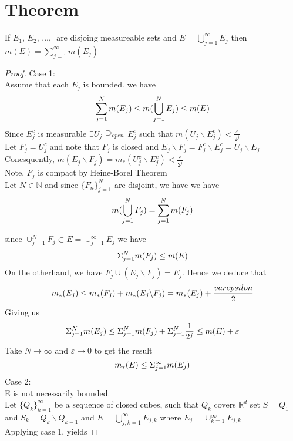 \documentclass{article}[12 pt]
\begin{document}
\section{Theorem}
If $E_1,\,E_2,\,\dots,\,$ are disjoing measureable sets and $E = \bigcup_{j=1}^{\infty}E_j$ then $m(E) = \sum_{j=1}^{\infty}m(E_j)$\\
\begin{proof}
	Case 1:\\
	Assume that each $E_j$ is bounded. we have
	\begin{equation}
		\sum_{j=1}^{N}m(E_j) \leq m(\bigcup_{j=1}^{N}E_j) \leq m(E)\\
	\end{equation}
	Since $E_{j}^{c}$ is measurable $\exists U_j \substack{\supset_{open}} E_j^{c}$ such that $m(U_j\backslash E_j^{c}) < \frac{\varepsilon}{2^j}$\\
	Let $F_j = U_j^{c}$ and note that $F_j$ is closed and $E_j \backslash F_j = F_j^{c} \backslash E_j^{c} = U_j \backslash E_j$\\
	Conesquently, $m(E_j\backslash F_j) = m_*(U_j^{c}\backslash E_j^{c})< \frac{\varepsilon}{2^j}$\\
	Note, $F_j$ is compact by Heine-Borel Theorem\\
	Let $N \in \mathbb{N}$ and since $\{F_n\}_{j=1}^{N}$ are disjoint, we have we have
	\begin{equation}
		m(\bigcup_{j=1}^{N}F_j) = \sum_{j=1}^{N}m(F_j)\\
	\end{equation}

	since $\cup_{j=1}^{N}F_j \subset E = \cup_{j=1}^{\infty}E_j$ we have
	\begin{equation}
		\Sigma_{j=1}^{N}m(F_j) \leq m(E)\\
	\end{equation}
	On the otherhand, we have $F_j \cup (E_j\backslash F_j) = E_j$. Hence we deduce that
	\begin{equation}
		m_*(E_j) \leq m_* (F_j) + m_*(E_j\backslash F_j) = m_*(E_j) + \frac{varepsilon}{2}\\
	\end{equation}
	Giving us
	\begin{equation}
		\Sigma_{j=1}^{N}m(E_j) \leq \Sigma_{j=1}^{N}m(F_j) + \Sigma_{j=1}^{N}\frac{1}{2^j} \leq m(E) + \varepsilon\\
	\end{equation}
	Take $N \to \infty$ and $\varepsilon \to 0$ to get the result\\
	\begin{equation}
		m_*(E) \leq \Sigma_{j=1}^{\infty}m(E_j)\\
	\end{equation}
	Case 2:\\
	E is not necessarily bounded.\\
	Let $\{Q_k\}_{k=1}^{\infty}$ be a sequence of closed cubes, such that $Q_k$ covers $\mathbb{R}^d$
	set $S = Q_1$ and $S_k = Q_k \backslash Q_{k-1}$
	and $E = \bigcup_{j,k=1}^{\infty}E_{j,k}$ where $E_j = \cup_{k=1}^{\infty}E_{j,k}$\\
	Applying case 1, yields


\end{proof}
\end{document}
